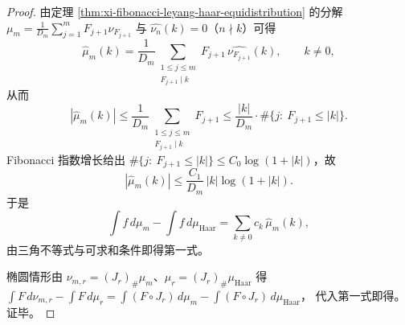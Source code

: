 \begin{proof}
由定理 \ref{thm:xi-fibonacci-leyang-haar-equidistribution} 的分解
\(
\mu_m=\frac{1}{D_m}\sum_{j=1}^m F_{j+1}\nu_{F_{j+1}}
\)
与 \(\widehat{\nu_n}(k)=0\)（\(n\nmid k\)）可得
\[
\widehat\mu_m(k)
=\frac{1}{D_m}\sum_{\substack{1\le j\le m\\ F_{j+1}\mid k}}F_{j+1}\,\widehat{\nu_{F_{j+1}}}(k),
\qquad k\neq 0,
\]
从而
\[
|\widehat\mu_m(k)|
\le
\frac{1}{D_m}\sum_{\substack{1\le j\le m\\ F_{j+1}\mid k}}F_{j+1}
\le
\frac{|k|}{D_m}\cdot \#\{j:\ F_{j+1}\le |k|\}.
\]
Fibonacci 指数增长给出 \(\#\{j:\ F_{j+1}\le |k|\}\le C_0\log(1+|k|)\)，故
\[
|\widehat\mu_m(k)|\le \frac{C_1}{D_m}\,|k|\log(1+|k|).
\]
于是
\[
\int f\,d\mu_m-\int f\,d\mu_{\mathrm{Haar}}
=\sum_{k\neq 0} c_k\,\widehat\mu_m(k),
\]
由三角不等式与可求和条件即得第一式。
\par
椭圆情形由 \(\nu_{m,r}=(J_r)_{\#}\mu_m\)、\(\mu_r=(J_r)_{\#}\mu_{\mathrm{Haar}}\) 得
\(
\int F\,d\nu_{m,r}-\int F\,d\mu_r=\int (F\circ J_r)\,d\mu_m-\int (F\circ J_r)\,d\mu_{\mathrm{Haar}}
\)，
代入第一式即得。证毕。
\end{proof}

\endinput
